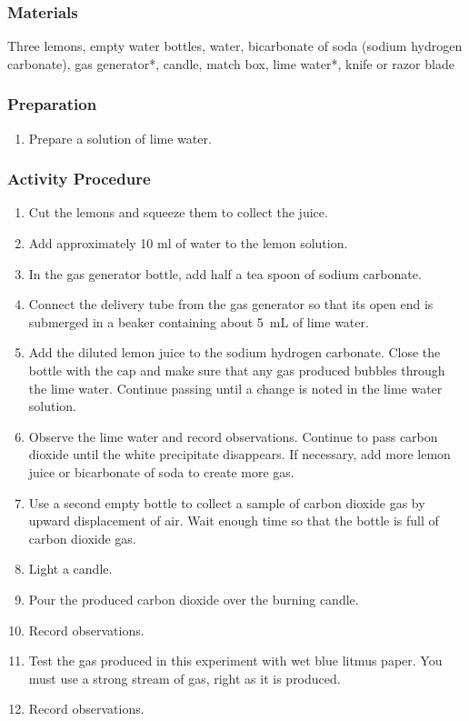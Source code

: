 \subsubsection*{Materials}
Three lemons, empty water bottles, water, bicarbonate of soda (sodium hydrogen carbonate), gas generator*, candle, match box, lime water*, knife or razor blade

\subsubsection*{Preparation}
\begin{enumerate}
\item{Prepare a solution of lime water.}
\end{enumerate}

\subsubsection*{Activity Procedure}
\begin{enumerate}
\item{Cut the lemons and squeeze them to collect the juice.}
\item{Add approximately 10 ml of water to the lemon solution.}
\item{In the gas generator bottle, add half a tea spoon of sodium carbonate.}
\item{Connect the delivery tube from the gas generator so that its open end is submerged in a beaker containing about 5~mL of lime water.}
\item{Add the diluted lemon juice to the sodium hydrogen carbonate. Close the bottle with the cap and make sure that any gas produced bubbles through the lime water. Continue passing until a change is noted in the lime water solution.}
\item{Observe the lime water and record observations. Continue to pass carbon dioxide until the white precipitate disappears. If necessary, add more lemon juice or bicarbonate of soda to create more gas.}
\item{Use a second empty bottle to collect a sample of carbon dioxide gas by upward displacement of air. Wait enough time so that the bottle is full of carbon dioxide gas.}
\item{Light a candle.}
\item{Pour the produced carbon dioxide over the burning candle.}
\item{Record observations.}
\item{Test the gas produced in this experiment with wet blue litmus paper. You must use a strong stream of gas, right as it is produced.}
\item{Record observations.}
\end{enumerate}

